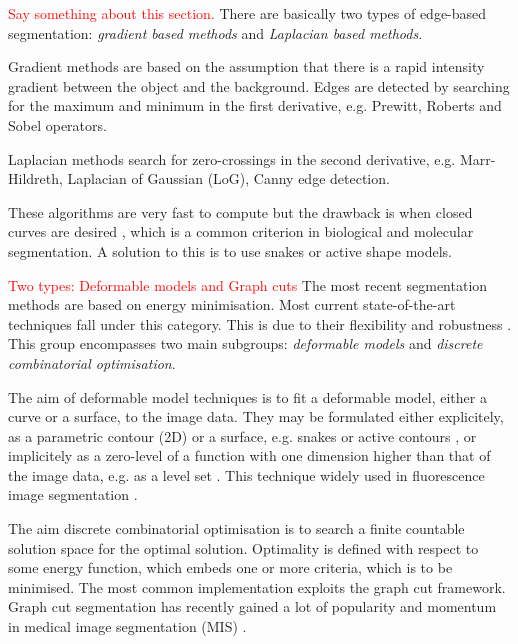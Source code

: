 \begin{definition}
	\textcolor{red}{Say something about this section.}
	There are basically two types of edge-based segmentation: \textit{gradient based methods} and \textit{Laplacian based methods}.
	
	Gradient methods are based on the assumption that there is a rapid intensity gradient between the object and the background.
	Edges are detected by searching for the maximum and minimum in the first derivative, e.g. Prewitt, Roberts and Sobel operators.
	
	Laplacian methods search for zero-crossings in the second derivative, e.g. Marr-Hildreth, Laplacian of Gaussian (LoG), Canny edge detection.
	
	These algorithms are very fast to compute but the drawback is when closed curves are desired \citep{Bengtsson2004}, which is a common criterion in biological and molecular segmentation.
	A solution to this is to use snakes or active shape models.
\end{definition}

\begin{definition}
	\textcolor{red}{Two types: Deformable models and Graph cuts}
	The most recent segmentation methods are based on energy minimisation.
	Most current state-of-the-art techniques fall under this category.
	This is due to their flexibility and robustness \citep{Danek2012}.
	This group encompasses two main subgroups: \textit{deformable models} and \textit{discrete combinatorial optimisation}.
	
	The aim of deformable model techniques is to fit a deformable model, either a curve or a surface, to the image data.
	They may be formulated either explicitely, as a parametric contour (2D) or a surface, e.g. snakes \citep{Kass1988} or active contours \citep{Caselles1997,Li2009,Cheng2009}, or implicitely as a zero-level of a function with one dimension higher than that of the image data, e.g. as a level set \citep{Osher2003}.
	This technique widely used in fluorescence image segmentation \citep{Dzyubachyk2008,Ortiz2001,Dufour2005,Dzyubachyk2010,Boukari2014,Maska2007}.
	
	The aim discrete combinatorial optimisation is to search a finite countable solution space for the optimal solution.
	Optimality is defined with respect to some energy function, which embeds one or more criteria, which is to be minimised.
	The most common implementation exploits the graph cut framework.
	Graph cut segmentation has recently gained a lot of popularity and momentum in medical image segmentation (MIS) \citep{Danek2009,Chen2008,Kofahi2010,Kong2011,Yang2009,Zhang2014,Liu2008,Vu2008}.
\end{definition}

